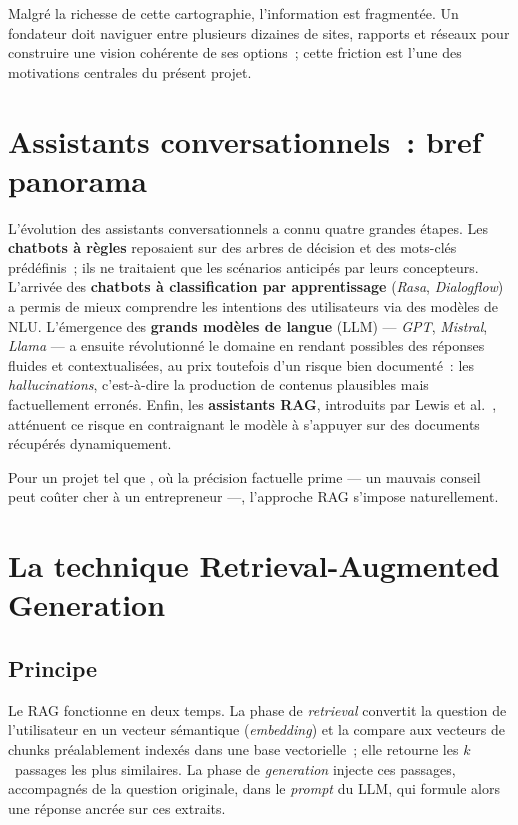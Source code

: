 Malgré la richesse de cette cartographie, l'information est fragmentée. Un fondateur doit naviguer entre plusieurs dizaines de sites, rapports et réseaux pour construire une vision cohérente de ses options~; cette friction est l'une des motivations centrales du présent projet.

\section{Assistants conversationnels~: bref panorama}

L'évolution des assistants conversationnels a connu quatre grandes étapes. Les \textbf{chatbots à règles} reposaient sur des arbres de décision et des mots-clés prédéfinis~; ils ne traitaient que les scénarios anticipés par leurs concepteurs. L'arrivée des \textbf{chatbots à classification par apprentissage} (\textit{Rasa}, \textit{Dialogflow}) a permis de mieux comprendre les intentions des utilisateurs via des modèles de \ac{NLU}. L'émergence des \textbf{grands modèles de langue} (\ac{LLM}) --- \textit{GPT}, \textit{Mistral}, \textit{Llama} --- a ensuite révolutionné le domaine en rendant possibles des réponses fluides et contextualisées, au prix toutefois d'un risque bien documenté~: les \textit{hallucinations}, c'est-à-dire la production de contenus plausibles mais factuellement erronés. Enfin, les \textbf{assistants \ac{RAG}}, introduits par Lewis et al.~\cite{lewis2020rag}, atténuent ce risque en contraignant le modèle à s'appuyer sur des documents récupérés dynamiquement.

Pour un projet tel que \tamwil{}, où la précision factuelle prime --- un mauvais conseil peut coûter cher à un entrepreneur ---, l'approche \ac{RAG} s'impose naturellement.

\section{La technique Retrieval-Augmented Generation}

\subsection{Principe}

Le \ac{RAG} fonctionne en deux temps. La phase de \textit{retrieval} convertit la question de l'utilisateur en un vecteur sémantique (\textit{embedding}) et la compare aux vecteurs de chunks préalablement indexés dans une base vectorielle~; elle retourne les $k$~passages les plus similaires. La phase de \textit{generation} injecte ces passages, accompagnés de la question originale, dans le \textit{prompt} du \ac{LLM}, qui formule alors une réponse ancrée sur ces extraits.

